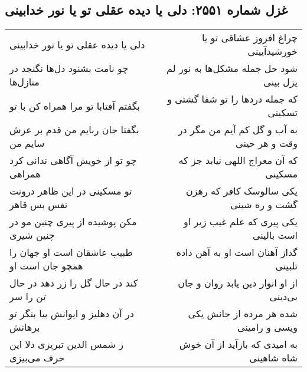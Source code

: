 \begin{center}
\section*{غزل شماره ۲۵۵۱: دلی یا دیده عقلی تو یا نور خدابینی}
\label{sec:2551}
\begin{longtable}{l p{0.5cm} r}
دلی یا دیده عقلی تو یا نور خدابینی
&&
چراغ افروز عشاقی تو یا خورشیدآیینی
\\
چو نامت بشنود دل‌ها نگنجد در منازل‌ها
&&
شود حل جمله مشکل‌ها به نور لم یزل بینی
\\
بگفتم آفتابا تو مرا همراه کن با تو
&&
که جمله دردها را تو شفا گشتی و تسکینی
\\
بگفتا جان ربایم من قدم بر عرش سایم من
&&
به آب و گل کم آیم من مگر در وقت و هر حینی
\\
چو تو از خویش آگاهی ندانی کرد همراهی
&&
که آن معراج اللهی نیابد جز که مسکینی
\\
تو مسکینی در این ظاهر درونت نفس بس قاهر
&&
یکی سالوسک کافر که رهزن گشت و ره شینی
\\
مکن پوشیده از پیری چنین مو در چنین شیری
&&
یکی پیری که علم غیب زیر او است بالینی
\\
طبیب عاشقان است او جهان را همچو جان است او
&&
گداز آهنان است او به آهن داده تلبینی
\\
کند در حال گل را زر دهد در حال تن را سر
&&
از او انوار دین یابد روان و جان بی‌دینی
\\
در آن دهلیز و ایوانش بیا بنگر تو برهانش
&&
شده هر مرده از جانش یکی ویسی و رامینی
\\
ز شمس الدین تبریزی دلا این حرف می‌بیزی
&&
به امیدی که بازآید از آن خوش شاه شاهینی
\\
\end{longtable}
\end{center}
